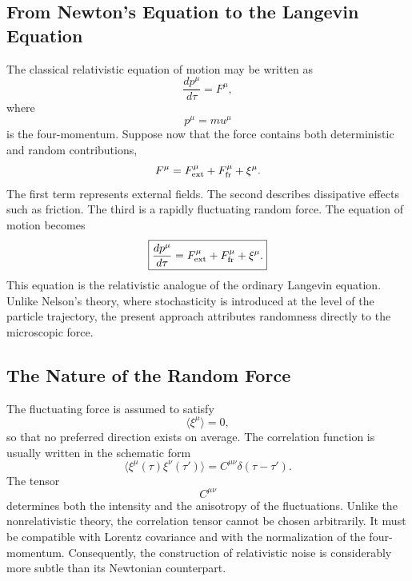 \subsection{From Newton's Equation to the Langevin Equation}
The classical relativistic equation of motion may be written as
\begin{equation}
\frac{dp^\mu}{d\tau}=F^\mu ,
\label{eq:RelNewton}
\end{equation}
where
\[p^\mu=mu^\mu\]
is the four-momentum.
Suppose now that the force contains both deterministic and random
contributions,
\begin{equation}
F^\mu=F^\mu_{\rm ext}+F^\mu_{\rm fr}+\xi^\mu .
\label{eq:ForceSplit}
\end{equation}
The first term represents external fields.
The second describes dissipative effects such as friction.
The third is a rapidly fluctuating random force.
The equation of motion becomes
\begin{equation}
\boxed{\frac{dp^\mu}{d\tau}=F^\mu_{\rm ext}+F^\mu_{\rm fr}+\xi^\mu .}
\label{eq:RelLangevin}
\end{equation}
This equation is the relativistic analogue of the ordinary Langevin
equation.
Unlike Nelson's theory, where stochasticity is introduced at the level
of the particle trajectory, the present approach attributes randomness
directly to the microscopic force.
\subsection{The Nature of the Random Force}
The fluctuating force is assumed to satisfy
\begin{equation}
\langle\xi^\mu\rangle=0,
\label{eq:MeanNoise}
\end{equation}
so that no preferred direction exists on average.
The correlation function is usually written in the schematic form
\begin{equation}
\boxed{\langle\xi^\mu(\tau)\xi^\nu(\tau')\rangle=C^{\mu\nu}\delta(\tau-\tau').}
\label{eq:NoiseCorrelation}
\end{equation}
The tensor
\[C^{\mu\nu}\]
determines both the intensity and the anisotropy of the fluctuations.
Unlike the nonrelativistic theory,
the correlation tensor cannot be chosen arbitrarily.
It must be compatible with Lorentz covariance and with the normalization
of the four-momentum.
Consequently,
the construction of relativistic noise is considerably more subtle than
its Newtonian counterpart.
